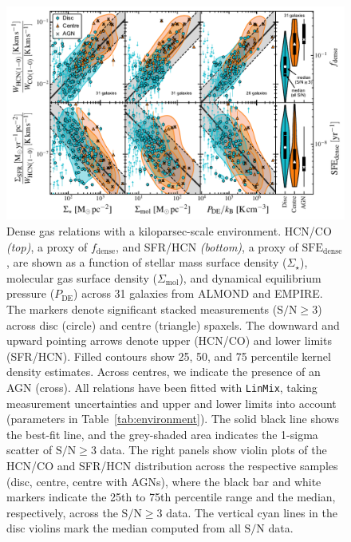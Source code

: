 \documentclass[letter, longauth]{aa} %
\newcommand*{\sigmol}{\ensuremath{\Sigma_{\text{mol}}}\xspace}  %
\newcommand*{\pde}{\ensuremath{P_{\text{DE}}}\xspace}  %
\newcommand*{\fdense}{\ensuremath{f_{\text{dense}}}\xspace}  %
\newcommand*{\sfedense}{\ensuremath{\text{SFE}_{\text{dense}}}\xspace}  %
\newcommand*{\sigstar}{\ensuremath{\Sigma_{\star}}\xspace}  %
\newcommand*{\snr}{\ensuremath{\mathrm{S}/\mathrm{N}}\xspace}  %
\begin{document}
\begin{figure}
\centering
\includegraphics[width=\textwidth]{Figures/HCN_scaling_relations_centre_vs_disc_compressed_v2.pdf}
\caption{Dense gas relations with a kiloparsec-scale environment. 
HCN/CO \textit{(top)}, a proxy of \fdense, and SFR/HCN \textit{(bottom)}, a proxy of \sfedense, are shown as a function of stellar mass surface density (\sigstar), molecular gas surface density (\sigmol), and dynamical equilibrium pressure (\pde) across 31 galaxies from ALMOND and EMPIRE.
The markers denote significant stacked measurements  ($\snr\geq 3$) across disc (circle) and centre (triangle) spaxels.
The downward and upward pointing arrows denote upper (HCN/CO) and lower limits (SFR/HCN).
Filled contours show 25, 50, and 75 percentile kernel density estimates.
Across centres, we indicate the presence of an AGN (cross).
All relations have been fitted with \texttt{LinMix}, taking measurement uncertainties and upper and lower limits into account (parameters in Table~\ref{tab:environment}).
The solid black line shows the best-fit line, and the grey-shaded area indicates the 1-sigma scatter of $\snr\geq 3$ data.
The right panels show violin plots of the HCN/CO and SFR/HCN distribution across the respective samples (disc, centre, centre with AGNs), where the black bar and white markers indicate the 25th to 75th percentile range and the median, respectively, across the $\snr\geq 3$ data.
The vertical cyan lines in the disc violins mark the median computed from all \snr data.
}
\label{fig:hcn_scaling_relations}
\end{figure}
\end{document}
